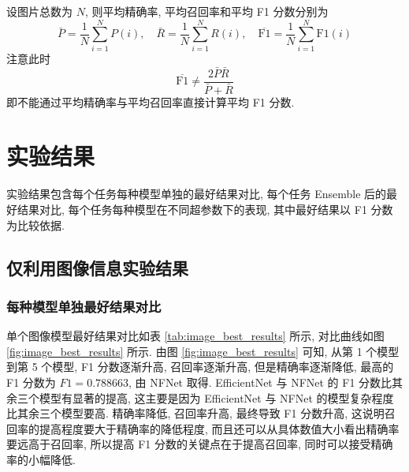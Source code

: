 \documentclass[12pt]{article}
\begin{document}
设图片总数为 $N$, 则平均精确率, 平均召回率和平均 F1 分数分别为
\begin{equation}
  \bar{P}=\frac{1}{N}\sum_{i=1}^NP(i),\quad
  \bar{R}=\frac{1}{N}\sum_{i=1}^NR(i),\quad
  \overline{\text{F1}}=\frac{1}{N}\sum_{i=1}^N\text{F1}(i)
\end{equation}
注意此时
\begin{equation}
  \overline{\text{F1}}\neq\frac{2\bar{P}\bar{R}}{\bar{P}+\bar{R}}
\end{equation}
即不能通过平均精确率与平均召回率直接计算平均 F1 分数.


\section{实验结果}

实验结果包含每个任务每种模型单独的最好结果对比, 每个任务 Ensemble 后的最好结果对比, 每个任务每种模型在不同超参数下的表现, 其中最好结果以 F1 分数为比较依据.

\subsection{仅利用图像信息实验结果}

\subsubsection{每种模型单独最好结果对比}

单个图像模型最好结果对比如表 \ref{tab:image_best_results} 所示, 对比曲线如图 \ref{fig:image_best_results} 所示. 由图 \ref{fig:image_best_results} 可知, 从第 1 个模型到第 5 个模型, F1 分数逐渐升高, 召回率逐渐升高, 但是精确率逐渐降低, 最高的 F1 分数为 $F1=0.788663$, 由 NFNet 取得. EfficientNet 与 NFNet 的 F1 分数比其余三个模型有显著的提高, 这主要是因为 EfficientNet 与 NFNet 的模型复杂程度比其余三个模型要高. 精确率降低, 召回率升高, 最终导致 F1 分数升高, 这说明召回率的提高程度要大于精确率的降低程度, 而且还可以从具体数值大小看出精确率要远高于召回率, 所以提高 F1 分数的关键点在于提高召回率, 同时可以接受精确率的小幅降低.
\end{document}

